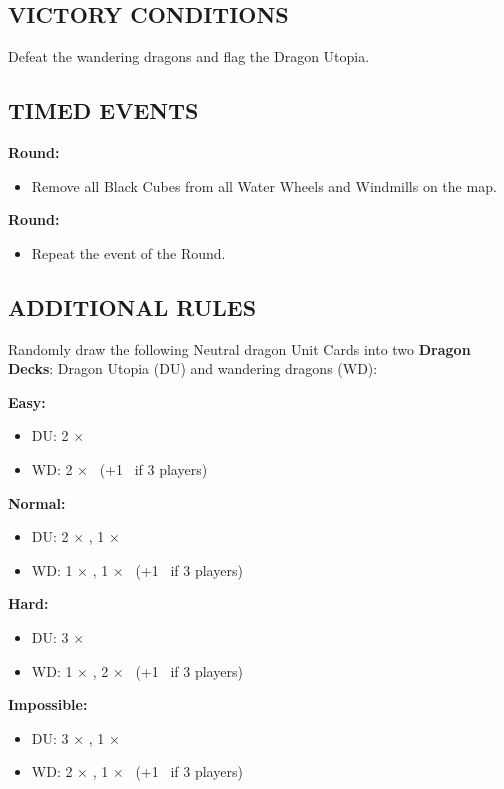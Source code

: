 \begin{multicols}{2}
\subsection*{\MakeUppercase{Victory Conditions}}
Defeat the wandering dragons and flag the Dragon Utopia.

\subsection*{\MakeUppercase{Timed Events}}
\textbf{ Round:}
\begin{itemize}
  \item Remove all Black Cubes from all Water Wheels and Windmills on the map.
\end{itemize}
\textbf{ Round:}
\begin{itemize}
  \item Repeat the event of the  Round.
\end{itemize}

\subsection*{\MakeUppercase{Additional Rules}}
Randomly draw the following Neutral dragon Unit Cards into two \textbf{Dragon Decks}: Dragon Utopia (DU) and wandering dragons (WD):

\textbf{Easy:}
\begin{itemize}
  \item DU: 2 × \azure\
  \item WD: 2 × \golden\ (+1 \golden\ if 3 players)
\end{itemize}
\textbf{Normal:}
\begin{itemize}
  \item DU: 2 × \azure, 1 × \golden\
  \item WD: 1 × \azure, 1 × \golden\ (+1 \golden\ if 3 players)
\end{itemize}
\textbf{Hard:}
\begin{itemize}
  \item DU: 3 × \azure\
  \item WD: 1 × \azure, 2 × \golden\ (+1 \golden\ if 3 players)
\end{itemize}
\textbf{Impossible:}
\begin{itemize}
  \item DU: 3 × \azure, 1 × \golden\
  \item WD: 2 × \azure, 1 × \golden\ (+1 \golden\ if 3 players)
\end{itemize}
\columnbreak


\end{multicols}
